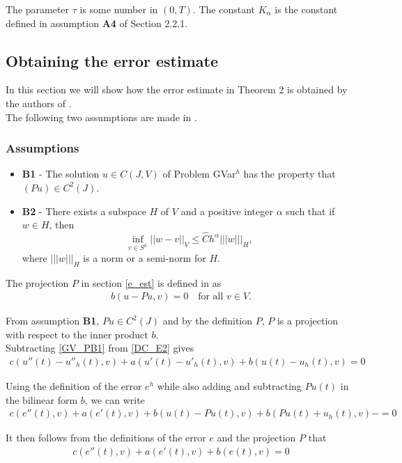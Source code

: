 \documentclass[../../main.tex]{subfiles}
\begin{document}
The parameter $\tau$ is some number in $(0,T)$. The constant $K_\alpha$ is the constant defined in assumption \textbf{A4} of Section 2.2.1.

\subsection{Obtaining the error estimate}
In this section we will show how the error estimate in Theorem 2 is obtained by the authors of \cite{BV13}.\\

The following two assumptions are made in \cite{BV13}.
\subsubsection*{Assumptions}
\begin{itemize}
	\item[] \textbf{B1} - The solution $u \in C(J,V)$ of Problem GVar$^h$ has the property that $(Pu) \in C^2(J)$.

	\item[] \textbf{B2} - There exists a subspace $H$ of $V$ and a positive integer $\alpha$ such that if $w \in H$, then $$\inf_{v\in S^{h}}||w-v||_V \leq \hat{C} h^\alpha|||w|||_H,$$ where $|||w|||_H$ is a norm or a semi-norm for $H$.
\end{itemize}

The projection $P$ in section \eqref{e_est} is defined in \cite{BV13} as
\begin{eqnarray*}
	b(u-Pu,v) = 0 \ \ \ \textrm{ for all } v \in V.
\end{eqnarray*}

From assumption \textbf{B1}, $Pu \in C^2(J)$ and by the definition $P$, $P$ is a projection with respect to the inner product $b$.\\

Subtracting \eqref{GV_PB1} from \eqref{DC_E2} gives
\begin{eqnarray*}
	c(u''(t)-u''_h(t),v) + a(u'(t)-u'_h(t),v) + b(u(t)-u_h(t),v) = 0
\end{eqnarray*}

Using the definition of the error $e^h$ while also adding and subtracting $Pu(t)$ in the bilinear form $b$, we can write
\begin{eqnarray*}
	c(e''(t),v) + a(e'(t),v) + b(u(t) - Pu(t),v) + b(Pu(t) +u_h(t),v)- = 0
\end{eqnarray*}

It then follows from the definitions of the error $e$ and the projection $P$ that
\begin{eqnarray*}
	c(e''(t),v) + a(e'(t),v) + b(e(t),v) = 0
\end{eqnarray*}
\end{document}
